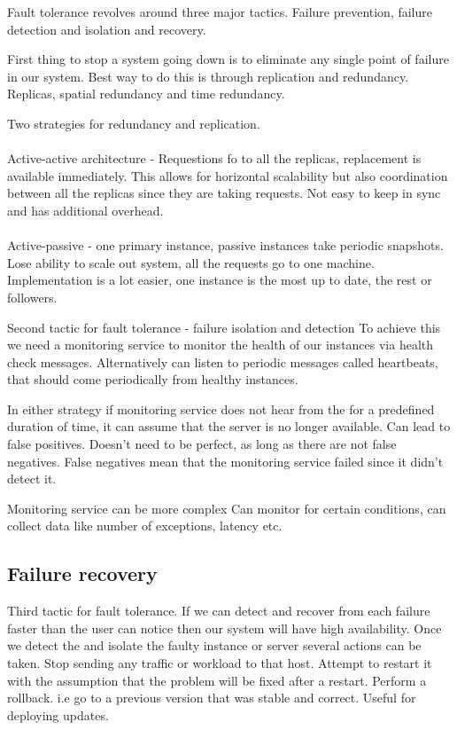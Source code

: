 \documentclass[a4paper, 11pt]{book}
\begin{document}
    Fault tolerance revolves around three major tactics.
    Failure prevention, failure detection and isolation and recovery.

    First thing to stop a system going down is to eliminate any single point of failure in our system.
    Best way to do this is through replication and redundancy.
    Replicas, spatial redundancy and time redundancy.

    Two strategies for redundancy and replication.

    \paragraph{}
    Active-active architecture - Requestions fo to all the replicas, replacement is available immediately.
    This allows for horizontal scalability but also coordination between all the replicas since they are taking requests.
    Not easy to keep in sync and has additional overhead.

    \paragraph{}
    Active-passive - one primary instance, passive instances take periodic snapshots.
    Lose ability to scale out system, all the requests go to one machine.
    Implementation is a lot easier, one instance is the most up to date, the rest or followers.

    Second tactic for fault tolerance - failure isolation and detection
    To achieve this we need a monitoring service to monitor the health of our instances via health check messages.
    Alternatively can listen to periodic messages called heartbeats, that should come periodically from healthy instances.

    In either strategy if monitoring service does not hear from the for a predefined duration of time, it can assume that the server is no longer available.
    Can lead to false positives.
    Doesn't need to be perfect, as long as there are not false negatives.
    False negatives mean that the monitoring service failed since it didn't detect it.

    Monitoring service can be more complex
    Can monitor for certain conditions, can collect data like number of exceptions, latency etc.

    \subsection{Failure recovery}
    Third tactic for fault tolerance.
    If we can detect and recover from each failure faster than the user can notice then our system will have high availability.
    Once we detect the and isolate the faulty instance or server several actions can be taken.
    Stop sending any traffic or workload to that host.
    Attempt to restart it with the assumption that the problem will be fixed after a restart.
    Perform a rollback.
    i.e go to a previous version that was stable and correct. Useful for deploying updates.
\end{document}
